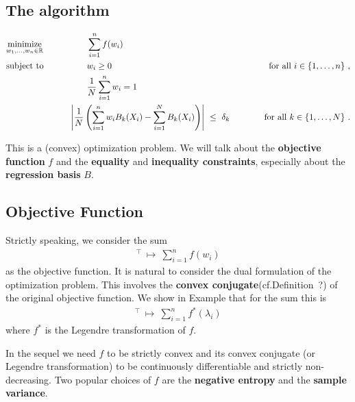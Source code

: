 \subsection*{The algorithm}
\begin{fproblem}
  \label{bw:1:primal}
\begin{align*}
    &\underset{w_1, \ldots, w_n \in \R}
    {\text{minimize}}
    &&\qquad\qquad
    \sum_{i = 1}^{n} 
    f(w_i)
    &&&
    \\
    &\text{subject to}
    &&\qquad\qquad
    w_i 
    \ge
    0
    &&&
    \qquad
    \text{for all}\ 
    i \in \left\{ 1, \ldots, n \right\}
    \,,
    \\
    & 
    &&\qquad\qquad
    \frac{1}{N}
    \sum_{i=1}^{n} 
    w_i
    =1
    \\
    & 
    &&\qquad
    \left| 
      \frac{1}{N} 
      \left( 
      \sum_{i = 1}^{n} 
      w_i
      B_k(X_i)
      -
      \sum_{i=1}^{N} 
      B_k(X_i)
      \right)
    \right|
    \ 
    \le 
    \ 
    \delta_k
    &&&
    \qquad
    \text{for all}\ 
    k \in \left\{ 1, \ldots, N \right\}
    \,.
\end{align*}
\end{fproblem}
This is a (convex) optimization problem. We will talk about the \textbf{objective function} $f$ and
the \textbf{equality} and \textbf{inequality constraints}, especially about the 
\textbf{regression basis} $B$.

\subsection*{Objective Function}
Strictly speaking, we consider the sum
\begin{gather}
  [w_1,\ldots,w_n]^\top
  \ 
  \mapsto
  \ 
  \sum_{i=1}^{n} 
  f(w_i)
\end{gather}
as the objective function. It is natural to consider the dual formulation of the optimization problem. This involves the \textbf{convex conjugate}(cf.Definition~?) of the original objective function. We show in Example that for the sum this is
\begin{gather}
  [\lambda_1,\ldots,\lambda_n]^\top
  \ 
  \mapsto
  \ 
  \sum_{i=1}^{n} 
  f^*(\lambda_i)
\end{gather}
where $f^*$ is the Legendre transformation of $f$.

In the sequel we need $f$ to be strictly convex and its convex conjugate (or Legendre transformation) to be continuously differentiable and strictly non-decreasing.
Two popular choices of $f$ are the \textbf{negative entropy} and the \textbf{sample variance}.
